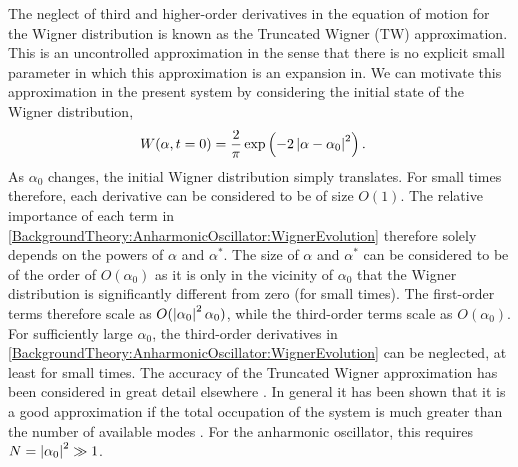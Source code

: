 The neglect of third and higher-order derivatives in the equation of motion for the Wigner distribution is known as the Truncated Wigner (TW) approximation.  This is an uncontrolled approximation in the sense that there is no explicit small parameter in which this approximation is an expansion in.  We can motivate this approximation in the present system by considering the initial state of the Wigner distribution,
\begin{align}
    W(\alpha, t=0) &= \frac{2}{\pi} \exp\left(- 2 \abs{\alpha - \alpha_0}^2\right). \label{BackgroundTheory:WignerFunctionCoherentState}
\end{align}
As $\alpha_0$ changes, the initial Wigner distribution simply translates.  For small times therefore, each derivative can be considered to be of size $O(1)$.  The relative importance of each term in \eqref{BackgroundTheory:AnharmonicOscillator:WignerEvolution} therefore solely depends on the powers of $\alpha$ and $\alpha^*$.  The size of $\alpha$ and $\alpha^*$ can be considered to be of the order of $O(\alpha_0)$ as it is only in the vicinity of $\alpha_0$ that the Wigner distribution is significantly different from zero (for small times).  The first-order terms therefore scale as $O(\left|\alpha_0\right|^2 \alpha_0)$, while the third-order terms scale as $O(\alpha_0)$.  For sufficiently large $\alpha_0$, the third-order derivatives in \eqref{BackgroundTheory:AnharmonicOscillator:WignerEvolution} can be neglected, at least for small times.  The accuracy of the Truncated Wigner approximation has been considered in great detail elsewhere \citep{Sinatra:2002lq,Norrie:2005fk,Norrie:2006vn,Norrie:2006kx,Polkovnikov:2003}.  In general it has been shown that it is a good approximation if the total occupation of the system is much greater than the number of available modes \citep{Norrie:2006vn}.  For the anharmonic oscillator, this requires $N = \left|\alpha_0\right|^2 \gg 1$.

